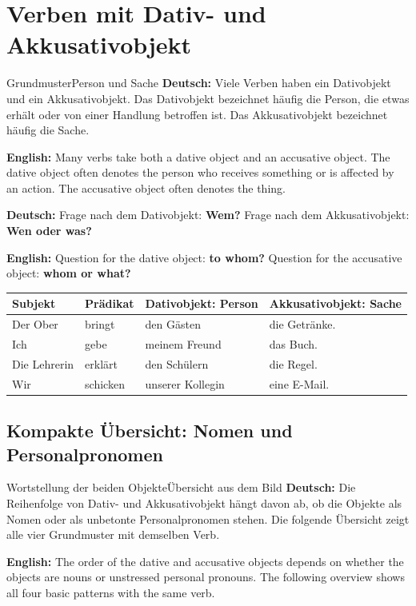 \documentclass[a4paper,11pt]{article}
\newcommand{\GermanText}[1]{\textbf{Deutsch: }#1\par}
\newcommand{\EnglishText}[1]{{\small\color{SoftGray}\textbf{English: }#1\par}}
\newcommand{\TableHeader}[1]{\color{white}\textbf{#1}}
\begin{document}
    
    \section{Verben mit Dativ- und Akkusativobjekt}
        
        \begin{grammarentry}{Grundmuster}{Person und Sache}
            \GermanText{Viele Verben haben ein Dativobjekt und ein Akkusativobjekt. Das Dativobjekt bezeichnet häufig die Person, die etwas erhält oder von einer Handlung betroffen ist. Das Akkusativobjekt bezeichnet häufig die Sache.}
            \EnglishText{Many verbs take both a dative object and an accusative object. The dative object often denotes the person who receives something or is affected by an action. The accusative object often denotes the thing.}
            
            \GermanText{Frage nach dem Dativobjekt: \textbf{Wem?} \quad Frage nach dem Akkusativobjekt: \textbf{Wen oder was?}}
            \EnglishText{Question for the dative object: \textbf{to whom?} \quad Question for the accusative object: \textbf{whom or what?}}
        \end{grammarentry}
        
        \begin{longtable}{|p{2.4cm}|p{2.5cm}|p{4.1cm}|p{4.3cm}|}
            \hline
            \rowcolor{HeaderBlueDark}
            \TableHeader{Subjekt} & \TableHeader{Prädikat} & \TableHeader{Dativobjekt: Person} & \TableHeader{Akkusativobjekt: Sache} \\
            \hline
            Der Ober & bringt & den Gästen & die Getränke. \\
            \hline
            Ich & gebe & meinem Freund & das Buch. \\
            \hline
            Die Lehrerin & erklärt & den Schülern & die Regel. \\
            \hline
            Wir & schicken & unserer Kollegin & eine E-Mail. \\
            \hline
        \end{longtable}
        
        \subsection{Kompakte Übersicht: Nomen und Personalpronomen}
            
            \begin{grammarentry}{Wortstellung der beiden Objekte}{Übersicht aus dem Bild}
                \GermanText{Die Reihenfolge von Dativ- und Akkusativobjekt hängt davon ab, ob die Objekte als Nomen oder als unbetonte Personalpronomen stehen. Die folgende Übersicht zeigt alle vier Grundmuster mit demselben Verb.}
                \EnglishText{The order of the dative and accusative objects depends on whether the objects are nouns or unstressed personal pronouns. The following overview shows all four basic patterns with the same verb.}
            \end{grammarentry}
            
\end{document}
